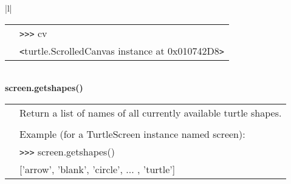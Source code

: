 \begin{center}
{\begin{tabular}{|l|}
\begin{tabular}{p{0.25in}p{4in}}
&        \verb+>+\verb+>+\verb+>+ cv \\
&        \verb+<+turtle.ScrolledCanvas instance at 0x010742D8\verb+>+ \\
\end{tabular} \\ \hline
{\bf    screen.getshapes()} \\
   \begin{tabular}{p{0.25in}p{4in}}
&        Return a list of names of all currently available turtle shapes. \\
&  \\
&        Example (for a TurtleScreen instance named screen): \\
&        \verb+>+\verb+>+\verb+>+ screen.getshapes() \\
&        ['arrow', 'blank', 'circle', ... , 'turtle'] \\


\end{tabular} \\ \hline
\end{tabular}}
\end{center}

